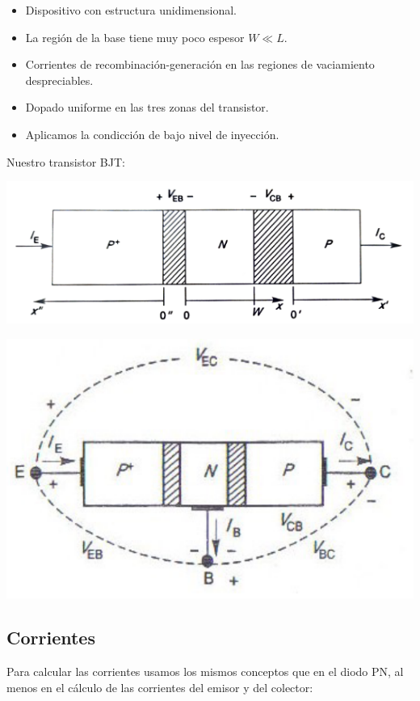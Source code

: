 \begin{itemize}
    \item Dispositivo con estructura unidimensional.
    \item La región de la base tiene muy poco espesor $W\ll L$.
    \item Corrientes de recombinación-generación en las regiones de vaciamiento despreciables.
    \item Dopado uniforme en las tres zonas del transistor.
    \item Aplicamos la condicción de bajo nivel de inyección. 
\end{itemize}
Nuestro transistor BJT: 

\begin{minipage}{0.45\linewidth} \centering
    \includegraphics[width=0.6\linewidth]{Cuerpo/Ch_04/Fig-01.png}
\end{minipage} \hfill
\begin{minipage}{0.45\linewidth} \centering
    \includegraphics[width=0.6\linewidth]{Cuerpo/Ch_04/Fig-02.png}
\end{minipage}

\subsection{Corrientes}

Para calcular las corrientes usamos los mismos conceptos que en el diodo PN, al menos en el cálculo de las corrientes del emisor y del colector:

